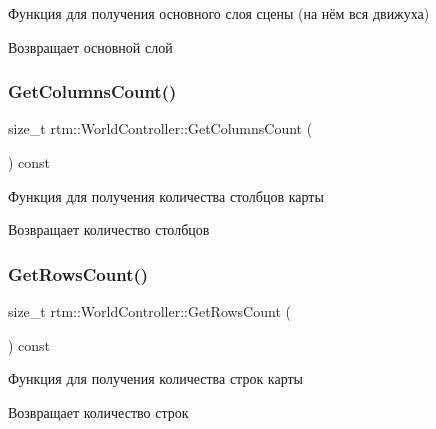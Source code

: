 Функция для получения основного слоя сцены (на нём вся движуха) 

\begin{DoxyReturn}{Возвращает}
основной слой 
\end{DoxyReturn}
\mbox{\label{classrtm_1_1_world_controller_af845be3c9945c0a2250f32e134a04294}} 
\subsubsection{\texorpdfstring{Get\+Columns\+Count()}{GetColumnsCount()}}
{\footnotesize\ttfamily size\+\_\+t rtm\+::\+World\+Controller\+::\+Get\+Columns\+Count (\begin{DoxyParamCaption}{ }\end{DoxyParamCaption}) const}



Функция для получения количества столбцов карты 

\begin{DoxyReturn}{Возвращает}
количество столбцов 
\end{DoxyReturn}
\mbox{\label{classrtm_1_1_world_controller_afb245167ac0680db01a3d09f80051dd0}} 
\subsubsection{\texorpdfstring{Get\+Rows\+Count()}{GetRowsCount()}}
{\footnotesize\ttfamily size\+\_\+t rtm\+::\+World\+Controller\+::\+Get\+Rows\+Count (\begin{DoxyParamCaption}{ }\end{DoxyParamCaption}) const}



Функция для получения количества строк карты 

\begin{DoxyReturn}{Возвращает}
количество строк 
\end{DoxyReturn}
\mbox{\label{classrtm_1_1_world_controller_a2288dd191a28070d4811897281413c36}} 
